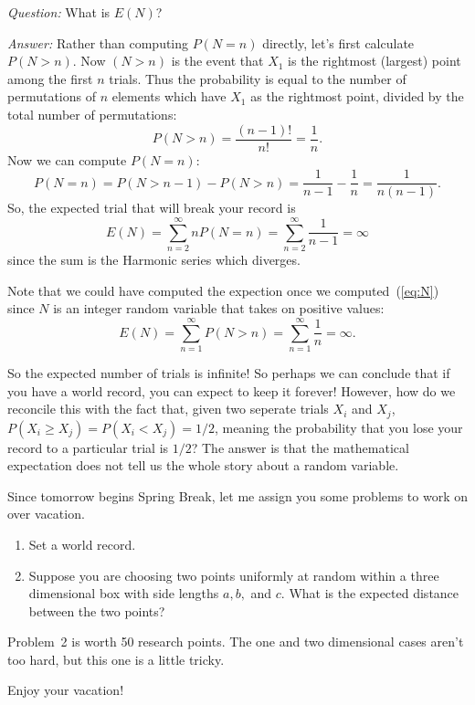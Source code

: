 {\em Question:}
What is $E(N)$?

{\em Answer:}
Rather than computing $P(N=n)$ directly, let's first calculate 
$P(N>n)$.  
Now $(N>n)$ is the event that $X_1$ is the rightmost (largest) point
among the first $n$ trials.  
Thus the probability is equal to the number of permutations of $n$
elements which have $X_1$ as the rightmost point, divided by the total
number of permutations:
\begin{equation}
  P(N > n) = \frac{(n-1)!}{n!} = \frac{1}{n}.
\label{eq:N}
\end{equation}
Now we can compute $P(N=n):$
\[
  P(N=n) = P(N>n-1) - P(N>n) = \frac{1}{n-1} - \frac{1}{n} = \frac{1}{n(n-1)}.
\]
So, the expected trial that will break your record is
\[
  E(N) = \sum_{n=2}^\infty n P(N=n) = \sum_{n=2}^\infty \frac{1}{n-1} 
	= \infty 
\]
since the sum is the Harmonic series which diverges. 

Note that we could have computed the expection once we computed~(\ref{eq:N})
since $N$ is an integer random variable that takes on positive values:
\[
  E(N) = \sum_{n=1}^\infty P(N>n) =\sum_{n=1}^\infty \frac{1}{n} = \infty.
\]

So the expected number of trials is infinite!  
So perhaps we can conclude that if you have a world record, you can
expect to keep it forever!
However, how do we reconcile this with the fact that, given two seperate
trials $X_i$ and $X_j$, $P(X_i \geq X_j) = P(X_i < X_j) = 1/2$, meaning
the probability that you lose your record to a particular trial is
$1/2$? 
The answer is that the mathematical expectation does not tell us the
whole story about a random variable.  

\medskip


\medskip

Since tomorrow begins Spring Break, let me assign you some problems to
work on over vacation.
\begin{enumerate}
  \item
Set a world record.
  \item
Suppose you are choosing two points uniformly at random within a three
dimensional box with side lengths $a,b,$ and $c$. 
What is the expected distance between the two points?
\end{enumerate}
Problem~2 is worth 50 research points.  
The one and two dimensional cases aren't too hard, but this one is a
little tricky.

\medskip

Enjoy your vacation!






